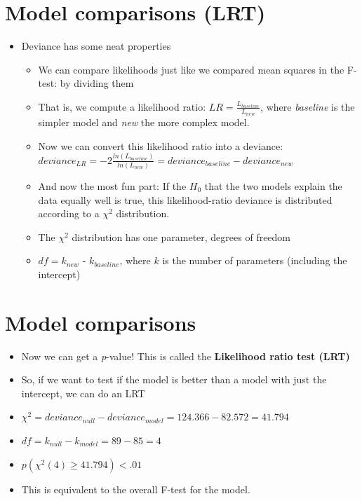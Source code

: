 \documentclass[]{article}
\begin{document}
\section{Model comparisons (LRT)}\label{model-comparisons-lrt}

\begin{itemize}
\itemsep1pt\parskip0pt
\item
  Deviance has some neat properties

  \begin{itemize}
  \itemsep1pt\parskip0pt
  \item
    We can compare likelihoods just like we compared mean squares in the
    F-test: by dividing them
  \item
    That is, we compute a likelihood ratio:
    $LR = \frac{L_{baseline}}{L_{new}}$, where \emph{baseline} is the
    simpler model and \emph{new} the more complex model.
  \item
    Now we can convert this likelihood ratio into a deviance:
    $deviance_{LR} = -2\frac{ln(L_{baseline})}{ln(L_{new})} = deviance_{baseline} - deviance_{new}$
  \item
    And now the most fun part: If the $H_0$ that the two models explain
    the data equally well is true, this likelihood-ratio deviance is
    distributed according to a $\chi^2$ distribution.
  \item
    The $\chi^2$ distribution has one parameter, degrees of freedom
  \item
    $df = k_{new}$ - $k_{baseline}$, where $k$ is the number of
    parameters (including the intercept)
  \end{itemize}
\end{itemize}

\section{Model comparisons}\label{model-comparisons}

\begin{itemize}
\itemsep1pt\parskip0pt
\item
  Now we can get a \emph{p}-value! This is called the \textbf{Likelihood
  ratio test (LRT)}
\item
  So, if we want to test if the model is better than a model with just
  the intercept, we can do an LRT
\item
  $\chi^2 = deviance_{null} - deviance_{model} = 124.366 - 82.572 = 41.794$
\item
  $df = k_{null} - k_{model} = 89 - 85 = 4$
\item
  $p(\chi^2(4) \geq 41.794) < .01$
\item
  This is equivalent to the overall F-test for the model.
\end{itemize}
\end{document}
